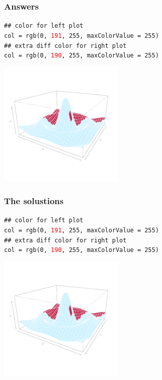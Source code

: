 \documentclass{beamer}
\begin{document}
\begin{frame}[fragile]
\frametitle{Answers}

\texttt{\textcolor{codegreen}{\#\# color for left plot}}\\
\texttt{col = rgb(0, \textcolor{red}{191}, 255, maxColorValue = 255)} \\

\texttt{\textcolor{codegreen}{\#\# extra diff color for right plot}}\\
\texttt{col = rgb(0, \textcolor{red}{190}, 255, maxColorValue = 255)} \\

\begin{center}
\includegraphics[height = 6cm, width = 6cm]{plot/persp_diff_3.pdf}
\end{center}

\end{frame}



\begin{frame}[fragile]
\frametitle{The solustions}

\texttt{\textcolor{codegreen}{\#\# color for left plot}}\\
\texttt{col = rgb(0, \textcolor{red}{191}, 255, maxColorValue = 255)} \\

\texttt{\textcolor{codegreen}{\#\# extra diff color for right plot}}\\
\texttt{col = rgb(0, \textcolor{red}{190}, 255, maxColorValue = 255)} \\

\begin{center}
\includegraphics[height = 6cm, width = 6cm]{plot/persp_diff_3.pdf}
\end{center}

\end{frame}
\end{document}
